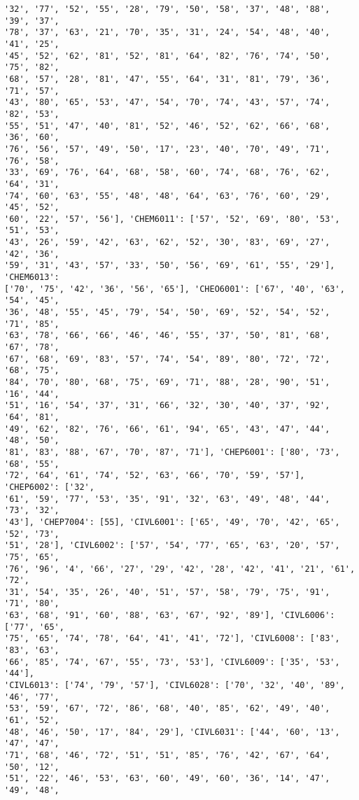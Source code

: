 \documentclass[11pt]{article}
\begin{document}
\begin{Verbatim}[commandchars=\\\{\}]
'32', '77', '52', '55', '28', '79', '50', '58', '37', '48', '88', '39', '37',
'78', '37', '63', '21', '70', '35', '31', '24', '54', '48', '40', '41', '25',
'45', '52', '62', '81', '52', '81', '64', '82', '76', '74', '50', '75', '82',
'68', '57', '28', '81', '47', '55', '64', '31', '81', '79', '36', '71', '57',
'43', '80', '65', '53', '47', '54', '70', '74', '43', '57', '74', '82', '53',
'55', '51', '47', '40', '81', '52', '46', '52', '62', '66', '68', '36', '60',
'76', '56', '57', '49', '50', '17', '23', '40', '70', '49', '71', '76', '58',
'33', '69', '76', '64', '68', '58', '60', '74', '68', '76', '62', '64', '31',
'74', '60', '63', '55', '48', '48', '64', '63', '76', '60', '29', '45', '52',
'60', '22', '57', '56'], 'CHEM6011': ['57', '52', '69', '80', '53', '51', '53',
'43', '26', '59', '42', '63', '62', '52', '30', '83', '69', '27', '42', '36',
'59', '31', '43', '57', '33', '50', '56', '69', '61', '55', '29'], 'CHEM6013':
['70', '75', '42', '36', '56', '65'], 'CHEO6001': ['67', '40', '63', '54', '45',
'36', '48', '55', '45', '79', '54', '50', '69', '52', '54', '52', '71', '85',
'63', '78', '66', '66', '46', '46', '55', '37', '50', '81', '68', '67', '78',
'67', '68', '69', '83', '57', '74', '54', '89', '80', '72', '72', '68', '75',
'84', '70', '80', '68', '75', '69', '71', '88', '28', '90', '51', '16', '44',
'51', '16', '54', '37', '31', '66', '32', '30', '40', '37', '92', '64', '81',
'49', '62', '82', '76', '66', '61', '94', '65', '43', '47', '44', '48', '50',
'81', '83', '88', '67', '70', '87', '71'], 'CHEP6001': ['80', '73', '68', '55',
'72', '64', '61', '74', '52', '63', '66', '70', '59', '57'], 'CHEP6002': ['32',
'61', '59', '77', '53', '35', '91', '32', '63', '49', '48', '44', '73', '32',
'43'], 'CHEP7004': [55], 'CIVL6001': ['65', '49', '70', '42', '65', '52', '73',
'51', '28'], 'CIVL6002': ['57', '54', '77', '65', '63', '20', '57', '75', '65',
'76', '96', '4', '66', '27', '29', '42', '28', '42', '41', '21', '61', '72',
'31', '54', '35', '26', '40', '51', '57', '58', '79', '75', '91', '71', '80',
'63', '68', '91', '60', '88', '63', '67', '92', '89'], 'CIVL6006': ['77', '65',
'75', '65', '74', '78', '64', '41', '41', '72'], 'CIVL6008': ['83', '83', '63',
'66', '85', '74', '67', '55', '73', '53'], 'CIVL6009': ['35', '53', '44'],
'CIVL6013': ['74', '79', '57'], 'CIVL6028': ['70', '32', '40', '89', '46', '77',
'53', '59', '67', '72', '86', '68', '40', '85', '62', '49', '40', '61', '52',
'48', '46', '50', '17', '84', '29'], 'CIVL6031': ['44', '60', '13', '47', '47',
'71', '68', '46', '72', '51', '51', '85', '76', '42', '67', '64', '50', '12',
'51', '22', '46', '53', '63', '60', '49', '60', '36', '14', '47', '49', '48',

\end{Verbatim}
\end{document}
